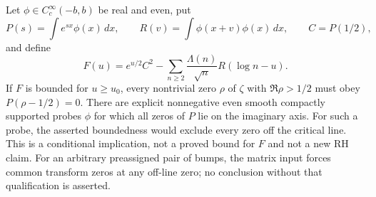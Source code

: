 \begin{proposition}
\label{prop:ns43-bump-strength}
Let $\phi\in C_c^\infty(-b,b)$ be real and even, put
\[
 P(s)=\int e^{sx}\phi(x)\,dx,\qquad
 R(v)=\int\phi(x+v)\phi(x)\,dx,\qquad C=P(1/2),
\]
and define
\[
 F(u)=e^{u/2}C^2-
        \sum_{n\ge2}\frac{\Lambda(n)}{\sqrt n}R(\log n-u).
\]
If $F$ is bounded for $u\ge u_0$, every nontrivial zero $\rho$ of
$\zeta$ with $\Re\rho>1/2$ must obey $P(\rho-1/2)=0$.
There are explicit nonnegative even smooth compactly supported probes
$\phi$ for which all zeros of $P$ lie on the imaginary axis. For
such a probe, the asserted boundedness would exclude every zero off
the critical line. This is a conditional implication, not a proved
bound for $F$ and not a new RH claim. For an arbitrary preassigned
pair of bumps, the matrix input forces common transform zeros at
any off-line zero; no conclusion without that qualification is asserted.
\end{proposition}
